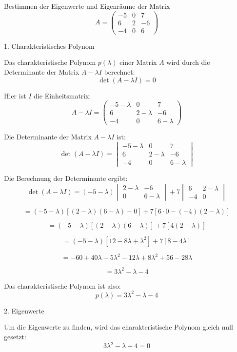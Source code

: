 Bestimmen der Eigenwerte und Eigenräume der Matrix
\[
A = \begin{pmatrix}
-5 & 0 & 7 \\
6 & 2 & -6 \\
-4 & 0 & 6
\end{pmatrix}
\]

1. Charakteristisches Polynom

Das charakteristische Polynom \( p(\lambda) \) einer Matrix \( A \) wird durch die Determinante der Matrix \( A - \lambda I \) berechnet:
\[
\det(A - \lambda I) = 0
\]

Hier ist \( I \) die Einheitsmatrix:
\[
A - \lambda I = \begin{pmatrix}
-5 - \lambda & 0 & 7 \\
6 & 2 - \lambda & -6 \\
-4 & 0 & 6 - \lambda
\end{pmatrix}
\]

Die Determinante der Matrix \( A - \lambda I \) ist:
\[
\det(A - \lambda I) = \begin{vmatrix}
-5 - \lambda & 0 & 7 \\
6 & 2 - \lambda & -6 \\
-4 & 0 & 6 - \lambda
\end{vmatrix}
\]

Die Berechnung der Determinante ergibt:
\[
\det(A - \lambda I) = (-5 - \lambda) \begin{vmatrix}
2 - \lambda & -6 \\
0 & 6 - \lambda
\end{vmatrix} + 7 \begin{vmatrix}
6 & 2 - \lambda \\
-4 & 0
\end{vmatrix}
\]

\[
= (-5 - \lambda) [(2 - \lambda)(6 - \lambda) - 0] + 7 [6 \cdot 0 - (-4)(2 - \lambda)]
\]

\[
= (-5 - \lambda) [(2 - \lambda)(6 - \lambda)] + 7 [4(2 - \lambda)]
\]

\[
= (-5 - \lambda) [12 - 8\lambda + \lambda^2] + 7 [8 - 4\lambda]
\]

\[
= -60 + 40\lambda - 5\lambda^2 - 12\lambda + 8\lambda^2 + 56 - 28\lambda
\]

\[
= 3\lambda^2 - \lambda - 4
\]

Das charakteristische Polynom ist also:
\[
p(\lambda) = 3\lambda^2 - \lambda - 4
\]

2. Eigenwerte

Um die Eigenwerte zu finden, wird das charakteristische Polynom gleich null gesetzt:
\[
3\lambda^2 - \lambda - 4 = 0
\]


